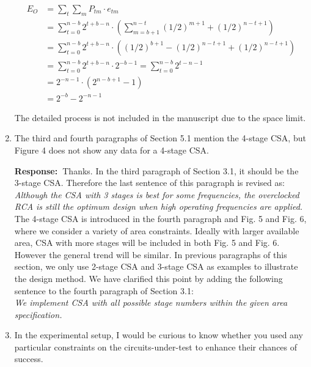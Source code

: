 \documentclass[a4paper, 11pt]{article}
\def\Response{\noindent \textbf{Response:~}}
\newcommand{\Question}[1]{\textcolor[rgb]{0.51,0.00,0.00}{#1}}
\newcommand{\PaperText}[1]{\emph{#1}}
\begin{document}
\begin{enumerate}
      \begin{align*}
        E_O&=\sum_t\sum_m P_{tm}\cdot e_{tm}\\ &=\sum_{t=0}^{n-b}2^{t+b-n}\cdot\left(\sum_{m=b+1}^{n-t}(1/2)^{m+1}+(1/2)^{n-t+1}\right)\\
        &=\sum_{t=0}^{n-b}2^{t+b-n}\cdot\left((1/2)^{b+1}-(1/2)^{n-t+1}+(1/2)^{n-t+1}\right)\\
        &=\sum_{t=0}^{n-b}2^{t+b-n}\cdot2^{-b-1}=\sum_{t=0}^{n-b}2^{t-n-1}\\
        &=2^{-n-1}\cdot\left(2^{n-b+1}-1\right)\\
        &=2^{-b}-2^{-n-1}
      \end{align*}
      
      The detailed process is not included in the manuscript due to the space limit.
      
  \item \Question{The third and fourth paragraphs of Section 5.1 mention the 4-stage CSA, but Figure 4 does not show any data for a 4-stage CSA.}
      
      \Response Thanks. In the third paragraph of Section 3.1, it should be the 3-stage CSA. Therefore the last sentence of this paragraph is revised as:\\
      
      \PaperText{Although the CSA with 3 stages is best for some frequencies, the overclocked RCA is still the optimum design when high operating frequencies are applied.}\\
      
      The 4-stage CSA is introduced in the fourth paragraph and Fig. 5 and Fig. 6, where we consider a variety of area constraints. Ideally with larger available area, CSA with more stages will be included in both Fig. 5 and Fig. 6. However the general trend will be similar. In previous paragraphs of this section, we only use 2-stage CSA and 3-stage CSA as examples to illustrate the design method. We have clarified this point by adding the following sentence to the fourth paragraph of Section 3.1:\\
      
      \PaperText{We implement CSA with all possible stage numbers within the given area specification.}\\
      
  \item \Question{In the experimental setup, I would be curious to know whether you used any particular constraints on the circuits-under-test to enhance their chances of success.}
      

\end{enumerate}
\end{document}
